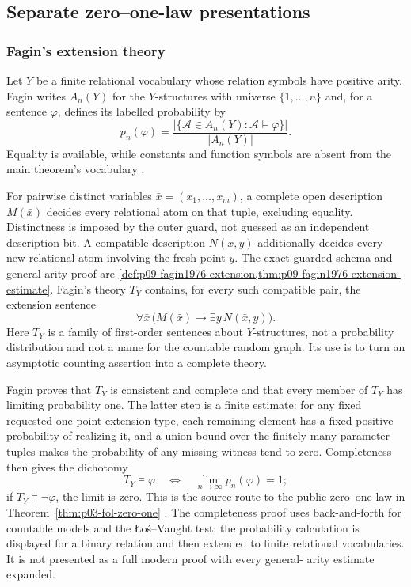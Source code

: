 
\subsection{Separate zero--one-law presentations}
\label{sec:p09-presentation-n-c-002}

\subsubsection{Fagin's extension theory}

Let \(Y\) be a finite relational vocabulary whose relation symbols have
positive arity.  Fagin writes \(A_n(Y)\) for the \(Y\)-structures with universe
\(\{1,\ldots,n\}\) and, for a sentence
\(\varphi\), defines its labelled probability by
\[
 p_n(\varphi)
 =
 \frac{\lvert\{\mathcal A\in A_n(Y):\mathcal A\models\varphi\}\rvert}
      {\lvert A_n(Y)\rvert}.
\]
Equality is available, while constants and function symbols are absent from
the main theorem's vocabulary \cite[pp.~50--51]{Fagin1976}.

For pairwise distinct variables \(\bar x=(x_1,\ldots,x_m)\), a complete open
description \(M(\bar x)\) decides every relational atom on that tuple,
excluding equality. Distinctness is imposed by the outer guard, not guessed
as an independent description bit. A compatible description
\(N(\bar x,y)\) additionally decides every new relational atom involving
the fresh point \(y\). The exact guarded schema and general-arity proof are
\cref{def:p09-fagin1976-extension,thm:p09-fagin1976-extension-estimate}.
Fagin's theory \(T_Y\) contains, for every
such compatible pair, the extension sentence
\[
 \forall\bar x\,
 \bigl(M(\bar x)\to\exists y\,N(\bar x,y)\bigr).
\]
Here \(T_Y\) is a family of first-order sentences about \(Y\)-structures, not
a probability distribution and not a name for the countable random graph.
Its use is to turn an asymptotic counting assertion into a complete theory.

Fagin proves that \(T_Y\) is consistent and complete and that every member of
\(T_Y\) has limiting probability one.  The latter step is a finite estimate:
for any fixed requested one-point extension type, each remaining element has a
fixed positive probability of realizing it, and a union bound over the finitely
many parameter tuples makes the probability of any missing witness tend to
zero.  Completeness then gives the dichotomy
\[
 T_Y\models\varphi
 \quad\Longleftrightarrow\quad
 \lim_{n\to\infty}p_n(\varphi)=1;
\]
if \(T_Y\models\neg\varphi\), the limit is zero.  This is the source route to
the public zero--one law in Theorem~\ref{thm:p03-fol-zero-one}
\cite[thms.~1--4]{Fagin1976}.  The completeness proof uses back-and-forth for
countable models and the \L o\'s--Vaught test; the probability calculation is
displayed for a binary relation and then extended to finite relational
vocabularies.  It is not presented as a full modern proof with every general-
arity estimate expanded.

